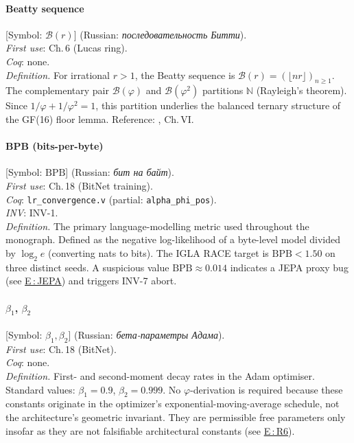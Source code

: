 \paragraph*{\textmd{\textbf{Beatty sequence}}}
\label{entry:beatty}
[Symbol: $\mathcal{B}(r)$] (Russian: \textit{последовательность Битти}).\\
\textit{First use}: Ch.\,6 (Lucas ring).\\
\textit{Coq}: none.\\
\textit{Definition.}
For irrational $r > 1$, the Beatty sequence is
$\mathcal{B}(r) = (\lfloor nr \rfloor)_{n \ge 1}$.
The complementary pair $\mathcal{B}(\varphi)$ and
$\mathcal{B}(\varphi^2)$ partitions $\mathbb{N}$ (Rayleigh's theorem).
Since $1/\varphi + 1/\varphi^2 = 1$, this partition underlies
the balanced ternary structure of the GF(16) floor lemma.
Reference: \cite{hardy_wright}, Ch.\,VI.

\paragraph*{\textmd{\textbf{BPB (bits-per-byte)}}}
\label{entry:bpb}
[Symbol: $\mathrm{BPB}$] (Russian: \textit{бит на байт}).\\
\textit{First use}: Ch.\,18 (BitNet training).\\
\textit{Coq}: \texttt{lr\_convergence.v} (partial: \texttt{alpha\_phi\_pos}).\\
\textit{INV}: INV-1.\\
\textit{Definition.}
The primary language-modelling metric used throughout the monograph.
Defined as the negative log-likelihood of a byte-level model divided
by $\log_2 e$ (converting nats to bits).
The IGLA RACE target is $\mathrm{BPB} < 1.50$ on three distinct seeds.
A suspicious value $\mathrm{BPB} \approx 0.014$ indicates a JEPA proxy
bug (see \hyperref[entry:jepa]{E\,:\,JEPA}) and triggers INV-7 abort.

\paragraph*{\textmd{\textbf{$\beta_1$, $\beta_2$}}}
\label{entry:betas}
[Symbol: $\beta_1, \beta_2$] (Russian: \textit{бета-параметры Адама}).\\
\textit{First use}: Ch.\,18 (BitNet).\\
\textit{Coq}: none.\\
\textit{Definition.}
First- and second-moment decay rates in the Adam optimiser.
Standard values: $\beta_1 = 0.9$, $\beta_2 = 0.999$.
No $\varphi$-derivation is required because these constants originate
in the optimizer's exponential-moving-average schedule, not the
architecture's geometric invariant. They are permissible free parameters
only insofar as they are not falsifiable architectural constants
(see \hyperref[entry:r6]{E\,:\,R6}).

